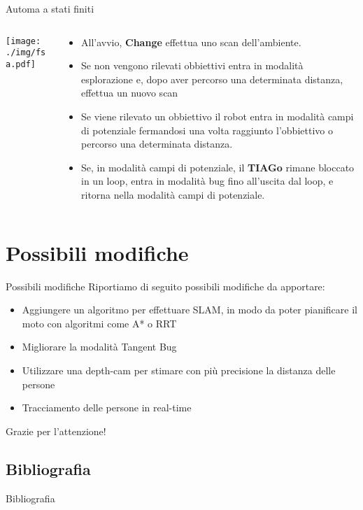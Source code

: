 \documentclass[aspectratio=169, leqno]{beamer}
\begin{document}
	\begin{frame}{Automa a stati finiti}
	\begin{columns}
		\begin{column}{0.25\textwidth}
				\hfuzz=42pt 
				\centering
				\texttt{[image: ./img/fsa.pdf]}
		\end{column}	
		\begin{column}{0.75\textwidth}
		\justifying
		\begin{itemize}[<+->]
			\justifying
			\item All'avvio, \textbf{Change} effettua uno scan dell'ambiente.
			\item Se non vengono rilevati obbiettivi entra in modalità
				esplorazione e, dopo aver percorso una determinata distanza,
				effettua un nuovo scan
			\item Se viene rilevato un obbiettivo il robot entra in modalità
				campi di potenziale fermandosi una volta raggiunto l'obbiettivo
				o percorso una determinata distanza.
			\item Se, in modalità campi di potenziale, il \textbf{TIAGo} rimane
				bloccato in un loop, entra in modalità bug fino all'uscita dal loop, e ritorna nella modalità campi di
				potenziale.
		\end{itemize}
		\end{column}
	\end{columns}	
	\end{frame}
	
	\section{Possibili modifiche}\label{sec:Possibli-modifiche}
	\frame{\sectionpage}
	\begin{frame}{Possibili modifiche}
	Riportiamo di seguito possibili modifiche da apportare:
		\begin{itemize}[<+->]
			\justifying
			\item Aggiungere un algoritmo per effettuare SLAM, in modo da poter
				pianificare il moto con algoritmi come A* \cite{A*} o RRT
				\cite{RRT}
			\item Migliorare la modalità Tangent Bug
			\item Utilizzare una depth-cam per stimare con più precisione la
				distanza delle persone
			\item Tracciamento delle persone in real-time
		\end{itemize}
	\end{frame}

	\begin{frame}
		\centering
		\Huge {\color{blue}Grazie per l'attenzione!}
	\end{frame}

	\subsection{Bibliografia}\label{subsec:Bibliografia}
	\begin{frame}[allowframebreaks]{Bibliografia}
		
		
	\end{frame}
\end{document}
